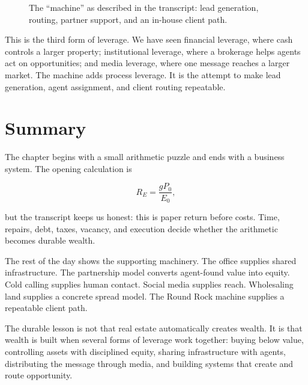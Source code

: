 \begin{figure}
\centering
{}
\caption{The ``machine'' as described in the transcript: lead generation, routing, partner support, and an in-house client path.}
\end{figure}

This is the third form of leverage. We have seen financial leverage, where cash controls a larger property; institutional leverage, where a brokerage helps agents act on opportunities; and media leverage, where one message reaches a larger market. The machine adds process leverage. It is the attempt to make lead generation, agent assignment, and client routing repeatable.

\section{Summary}

The chapter begins with a small arithmetic puzzle and ends with a business system. The opening calculation is

\begin{equation}
R_E = \frac{gP_0}{E_0},
\end{equation}

but the transcript keeps us honest: this is paper return before costs. Time, repairs, debt, taxes, vacancy, and execution decide whether the arithmetic becomes durable wealth.

The rest of the day shows the supporting machinery. The office supplies shared infrastructure. The partnership model converts agent-found value into equity. Cold calling supplies human contact. Social media supplies reach. Wholesaling land supplies a concrete spread model. The Round Rock machine supplies a repeatable client path.

The durable lesson is not that real estate automatically creates wealth. It is that wealth is built when several forms of leverage work together: buying below value, controlling assets with disciplined equity, sharing infrastructure with agents, distributing the message through media, and building systems that create and route opportunity.